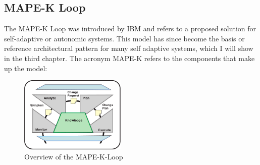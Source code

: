     \subsection{MAPE-K Loop}
    \label{sub:mape}
    The MAPE-K Loop was introduced by IBM \cite{Kephart:2003:VAC:642194.642200} and refers to a proposed solution for self-adaptive or autonomic systems.
    This model has since become the basis or reference architectural pattern for many self adaptive systems, which I will show in the third chapter.
    The acronym MAPE-K refers to the components that make up the model:
     \begin{figure}[hbt]
        \label{fig:mape}
        \centering
        \includegraphics[width=0.45\textwidth]{Bilder/mape.png}
        \caption{
                Overview of the MAPE-K-Loop\cite{Kephart:2003:VAC:642194.642200}
                }
    \end{figure}  
